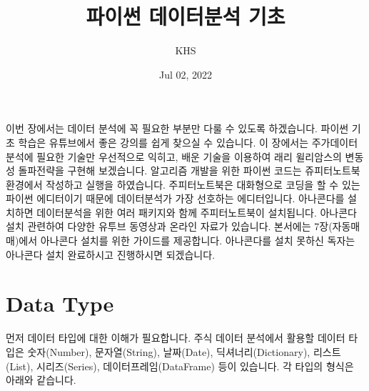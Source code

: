 \documentclass[letterpaper,10pt,english]{jupyterBook}
\title{파이썬 데이터분석 기초}
\date{Jul 02, 2022}
\author{KHS}
\begin{document}
\pagestyle{empty}
\sphinxmaketitle
\pagestyle{plain}
\sphinxtableofcontents
\pagestyle{normal}
\label{\detokenize{chapter2/2.1.0_Python_Basics::doc}}


\sphinxAtStartPar
이번 장에서는 데이터 분석에 꼭 필요한 부분만 다룰 수 있도록 하겠습니다. 파이썬 기초 학습은 유튜브에서 좋은 강의를 쉽게 찾으실 수 있습니다. 이 장에서는 주가데이터 분석에 필요한 기술만 우선적으로 익히고, 배운 기술을 이용하여 래리 윌리암스의 변동성 돌파전략을 구현해 보겠습니다. 알고리즘 개발을 위한 파이썬 코드는 쥬피터노트북 환경에서 작성하고 실행을 하였습니다. 주피터노트북은 대화형으로 코딩을 할 수 있는 파이썬 에디터이기 때문에 데이터분석가 가장 선호하는 에디터입니다. 아나콘다를 설치하면 데이터분석을 위한 여러 패키지와 함께 주피터노트북이 설치됩니다. 아나콘다 설치 관련하여 다양한 유투브 동영상과 온라인 자료가 있습니다. 본서에는 7장(자동매매)에서 아나콘다 설치를 위한 가이드를 제공합니다. 아나콘다를 설치 못하신 독자는 아나콘다 설치 완료하시고 진행하시면 되겠습니다.


\part{Data Type}
\label{\detokenize{chapter2/2.1.1_Python_Basics:data-type}}\label{\detokenize{chapter2/2.1.1_Python_Basics::doc}}
\sphinxAtStartPar
먼저 데이터 타입에 대한 이해가 필요합니다. 주식 데이터 분석에서 활용할 데이터 타입은 숫자(Number),  문자열(String),  날짜(Date), 딕셔너리(Dictionary), 리스트(List), 시리즈(Series), 데이터프레임(DataFrame) 등이 있습니다. 각 타입의 형식은 아래와 같습니다.
\end{document}
